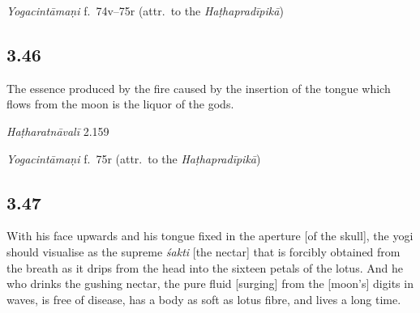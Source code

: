 \begin{ekdosis}
\begin{testimonia}[hp03_045]
\emph{Yogacintāmaṇi} f.~74v–75r (attr.~to the \emph{Haṭhapradīpikā})
\begin{versinnote}
\end{versinnote}

\end{testimonia}


\subsection*{3.46}
\begin{translation}[hp03_046]
The essence produced by the fire caused by the insertion of the tongue which flows from the moon is the liquor of the gods.
\end{translation}


\begin{testimonia}[hp03_046]
\emph{Haṭharatnāvalī} 2.159

\begin{versinnote}
\end{versinnote}

\emph{Yogacintāmaṇi} f.~75r (attr.~to the \emph{Haṭhapradīpikā})
\begin{versinnote}
\end{versinnote}

\end{testimonia}


\subsection*{3.47}
\begin{translation}[hp03_047]
With his face upwards and his tongue fixed in the aperture [of the skull], the yogi should visualise as the supreme \emph{śakti} [the nectar] that is forcibly obtained from the breath as it drips from the head into the sixteen petals of the lotus. And he who drinks the gushing nectar, the pure fluid [surging] from the [moon's] digits in waves, is free of disease, has a body as soft as lotus fibre, and lives a long time.
\end{translation}


\end{ekdosis}
